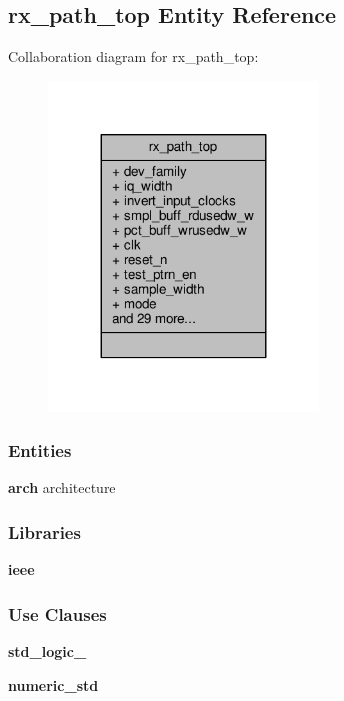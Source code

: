 \subsection{rx\+\_\+path\+\_\+top Entity Reference}
\label{classrx__path__top}


Collaboration diagram for rx\+\_\+path\+\_\+top\+:\nopagebreak
\begin{figure}[H]
\begin{center}
\leavevmode
\includegraphics[width=203pt]{d7/dcb/classrx__path__top__coll__graph}
\end{center}
\end{figure}
\subsubsection*{Entities}
\begin{DoxyCompactItemize}
\item 
{\bf arch} architecture
\end{DoxyCompactItemize}
\subsubsection*{Libraries}
 \begin{DoxyCompactItemize}
\item 
{\bf ieee} 
\end{DoxyCompactItemize}
\subsubsection*{Use Clauses}
 \begin{DoxyCompactItemize}
\item 
{\bf std\+\_\+logic\+\_}   
\item 
{\bf numeric\+\_\+std}   
\end{DoxyCompactItemize}
